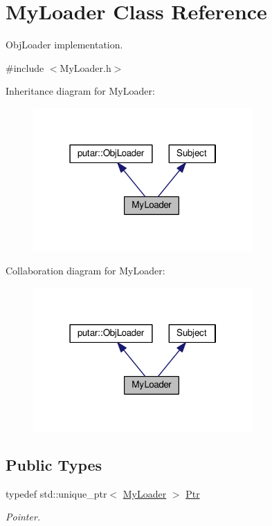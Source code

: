 \hypertarget{classMyLoader}{}\section{My\+Loader Class Reference}
\label{classMyLoader}


Obj\+Loader implementation.  




{\ttfamily \#include $<$My\+Loader.\+h$>$}



Inheritance diagram for My\+Loader\+:
\nopagebreak
\begin{figure}[H]
\begin{center}
\leavevmode
\includegraphics[width=238pt]{classMyLoader__inherit__graph}
\end{center}
\end{figure}


Collaboration diagram for My\+Loader\+:
\nopagebreak
\begin{figure}[H]
\begin{center}
\leavevmode
\includegraphics[width=238pt]{classMyLoader__coll__graph}
\end{center}
\end{figure}
\subsection*{Public Types}
\begin{DoxyCompactItemize}
\item 
typedef std\+::unique\+\_\+ptr$<$ \hyperlink{classMyLoader}{My\+Loader} $>$ \hyperlink{classMyLoader_acaf32066ff648b5d6743b91260c6ce28}{Ptr}\hypertarget{classMyLoader_acaf32066ff648b5d6743b91260c6ce28}{}\label{classMyLoader_acaf32066ff648b5d6743b91260c6ce28}

\begin{DoxyCompactList}\small\item\em Pointer. \end{DoxyCompactList}\end{DoxyCompactItemize}

